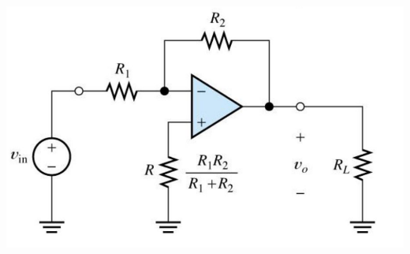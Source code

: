 \begin{itemize}
    \begin{center}
        \begin{minipage}{0.7\textwidth}
            \includegraphics[scale = 0.4]{../Ejercicio2-MediciondeBias/Informe/compib.png}
        \captionsetup{justification=centering}
        \label{ej2compib}
        \end{minipage}
    \end{center}
    
\end{itemize}